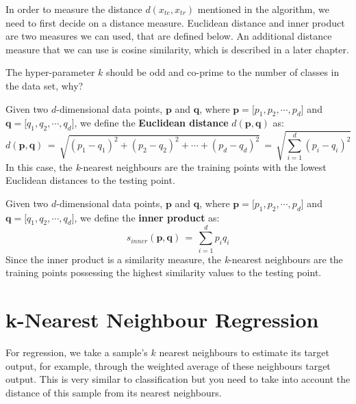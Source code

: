 \documentclass[11pt,fleqn]{book} %
\begin{document}
\noindent
In order to measure the distance $d(x_{te}, x_{tr})$ mentioned in the algorithm, we need to first decide on a distance measure. Euclidean distance and inner product are two measures we can used, that are defined below. An additional distance measure that we can use is cosine similarity, which is described in a later chapter.\\

\begin{exercise}
The hyper-parameter $k$ should be odd and co-prime to the number of classes in the data set, why?
\end{exercise}

\begin{definition}
Given two $d$-dimensional data points, $\mathbf{p}$ and $\mathbf{q}$, where $\mathbf{p}= \big[p_1, p_2, \cdots, p_d\big]$ and $\mathbf{q} = \big[q_1, q_2, \cdots, q_d\big]$, we define the \textbf{Euclidean distance} $d(\mathbf{p},\mathbf{q})$ as:
\begin{equation*}
	d(\mathbf{p},\mathbf{q}) \, = \, \sqrt{(p_1 - q_1)^2 + (p_2 - q_2)^2 + \cdots + (p_d - q_d)^2} \, = \, \sqrt{\sum^d_{i=1}(p_i - q_i)^2}
\end{equation*}
In this case, the \textit{k}-nearest neighbours are the training points with the lowest Euclidean distances to the testing point.
\end{definition}

\begin{definition}
Given two $d$-dimensional data points, $\mathbf{p}$ and $\mathbf{q}$, where $\mathbf{p}= \big[p_1, p_2, \cdots, p_d\big]$ and $\mathbf{q} = \big[q_1, q_2, \cdots, q_d\big]$, we define the \textbf{inner product} as:
\begin{equation*}
	s_{inner}(\mathbf{p},\mathbf{q}) \, = \, \sum^d_{i=1}p_iq_i
\end{equation*}
Since the inner product is a similarity measure, the \textit{k}-nearest neighbours are the training points possessing the highest similarity values to the testing point.
\end{definition}

\section{k-Nearest Neighbour Regression}
For regression, we take a sample's $k$ nearest neighbours to estimate its target output, for example, through the weighted average of these neighbours target output. This is very similar to classification but you need to take into account the distance of this sample from its nearest neighbours.
\end{document}

